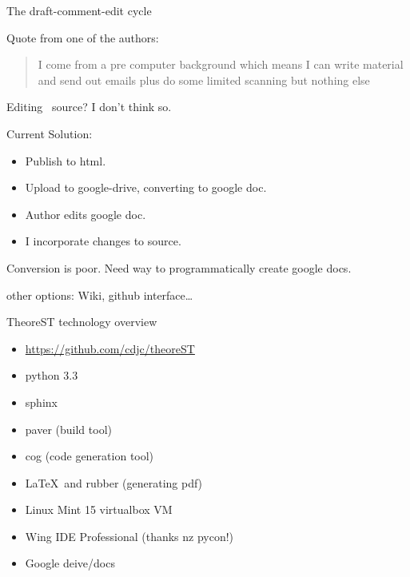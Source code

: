 \documentclass{beamer}
\begin{document}
\begin{frame}[fragile]{The draft-comment-edit cycle}

Quote from one of the authors:

\begin{quote}
I come from a pre computer background which means I can write material and
send out emails plus do some limited scanning but nothing else
\end{quote}

Editing \rst\ source? I don't think so.

Current Solution:

\begin{itemize}
\item Publish to html.
\item Upload to google-drive, converting to google doc.
\item Author edits google doc.
\item I incorporate changes to \rst source.
\end{itemize}
Conversion is poor. Need way to programmatically create google docs.

other options: Wiki, github interface\ldots
\end{frame}

\begin{frame}[fragile]{TheoreST technology overview}
\begin{itemize}
\item \url{https://github.com/cdjc/theoreST}
\item python 3.3
\item sphinx
\item paver (build tool)
\item cog (code generation tool)
\item \LaTeX\  and rubber (generating pdf)
\item Linux Mint 15 virtualbox VM
\item Wing IDE Professional (thanks nz pycon!)
\item Google deive/docs
\end{itemize}
\end{frame}
\end{document}
